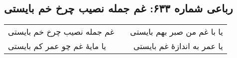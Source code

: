\begin{center}
\section*{رباعی شماره ۶۳۳: غم جمله نصیب چرخ خم بایستی}
\label{sec:sh633}
\begin{longtable}{l p{0.5cm} r}
غم جمله نصیب چرخ خم بایستی
&&
یا با غم من صبر بهم بایستی
\\
یا مایهٔ غم چو عمر کم بایستی
&&
یا عمر به اندازهٔ غم بایستی
\\
\end{longtable}
\end{center}
